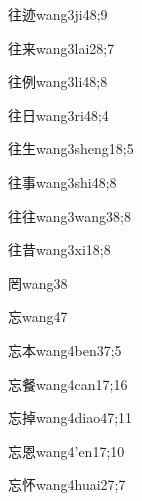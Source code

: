 \begin{verbete}{往迹}{wang3ji4}{8;9}
\end{verbete}
\begin{verbete}{往来}{wang3lai2}{8;7}
\end{verbete}
\begin{verbete}{往例}{wang3li4}{8;8}
\end{verbete}
\begin{verbete}{往日}{wang3ri4}{8;4}
\end{verbete}
\begin{verbete}{往生}{wang3sheng1}{8;5}
\end{verbete}
\begin{verbete}{往事}{wang3shi4}{8;8}
\end{verbete}
\begin{verbete}{往往}{wang3wang3}{8;8}
\end{verbete}
\begin{verbete}{往昔}{wang3xi1}{8;8}
\end{verbete}
\begin{verbete}{罔}{wang3}{8}
\end{verbete}
\begin{verbete}{忘}{wang4}{7}
\end{verbete}
\begin{verbete}{忘本}{wang4ben3}{7;5}
\end{verbete}
\begin{verbete}{忘餐}{wang4can1}{7;16}
\end{verbete}
\begin{verbete}{忘掉}{wang4diao4}{7;11}
\end{verbete}
\begin{verbete}{忘恩}{wang4'en1}{7;10}
\end{verbete}
\begin{verbete}{忘怀}{wang4huai2}{7;7}
\end{verbete}
